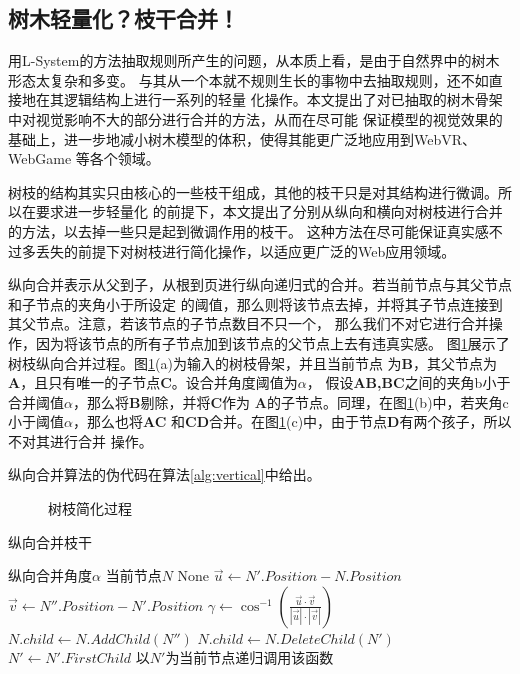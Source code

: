 \subsection{树木轻量化？枝干合并！}
\label{subsec:branchmerge}
用L-System的方法抽取规则所产生的问题，从本质上看，是由于自然界中的树木形态太复杂和多变。
与其从一个本就不规则生长的事物中去抽取规则，还不如直接地在其逻辑结构上进行一系列的轻量
化操作。本文提出了对已抽取的树木骨架中对视觉影响不大的部分进行合并的方法，从而在尽可能
保证模型的视觉效果的基础上，进一步地减小树木模型的体积，使得其能更广泛地应用到WebVR、WebGame
等各个领域。

树枝的结构其实只由核心的一些枝干组成，其他的枝干只是对其结构进行微调。所以在要求进一步轻量化
的前提下，本文提出了分别从纵向和横向对树枝进行合并的方法，以去掉一些只是起到微调作用的枝干。
这种方法在尽可能保证真实感不过多丢失的前提下对树枝进行简化操作，以适应更广泛的Web应用领域。

纵向合并表示从父到子，从根到页进行纵向递归式的合并。若当前节点与其父节点和子节点的夹角小于所设定
的阈值，那么则将该节点去掉，并将其子节点连接到其父节点。注意，若该节点的子节点数目不只一个，
那么我们不对它进行合并操作，因为将该节点的所有子节点加到该节点的父节点上去有违真实感。
图\ref{fig:vert}展示了树枝纵向合并过程。图\ref{fig:vert}(a)为输入的树枝骨架，并且当前节点
为\textbf{B}，其父节点为\textbf{A}，且只有唯一的子节点\textbf{C}。设合并角度阈值为$\alpha$，
假设\textbf{AB,BC}之间的夹角b小于合并阈值$\alpha$，那么将\textbf{B}剔除，并将\textbf{C}作为
\textbf{A}的子节点。同理，在图\ref{fig:vert}(b)中，若夹角c小于阈值$\alpha$，那么也将\textbf{AC}
和\textbf{CD}合并。在图\ref{fig:vert}(c)中，由于节点\textbf{D}有两个孩子，所以不对其进行合并
操作。

纵向合并算法的伪代码在算法\ref{alg:vertical}中给出。

\begin{figure}[H]
	\centering
\hspace{4em}
\hspace{4em}
	\caption{树枝简化过程}
	\label{fig:vert}
\end{figure}

\begin{algorithm}[H]
	\caption{纵向合并枝干}
	\label{alg:vertical}
	\begin{algorithmic}[1] 
		\Require 纵向合并角度$\alpha$
		\Require 当前节点$N$
		\Ensure None
		\State $\vec{u} \gets N'.Position-N.Position$
		\State $\vec{v} \gets N''.Position-N'.Position$
		\State $\gamma \gets \cos^{-1}({\frac{\vec{u} \cdot \vec{v}}{|\vec{u}|\cdot|\vec{v}|}})$
		\If{$\gamma<\alpha$}
		\State $N.child \gets N.AddChild(N'')$
		\State $N.child \gets N.DeleteChild(N') $
		\EndIf
		\State $N' \gets N'.FirstChild$
		\EndWhile
		\EndFor
		\State 以$N'$为当前节点递归调用该函数
		\EndFor
		\EndIf
	\end{algorithmic}
\end{algorithm}


